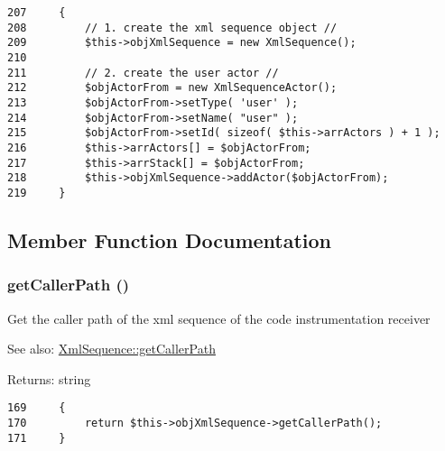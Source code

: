 \begin{Code}\begin{verbatim}207     {
208         // 1. create the xml sequence object //
209         $this->objXmlSequence = new XmlSequence();
210 
211         // 2. create the user actor //  
212         $objActorFrom = new XmlSequenceActor();
213         $objActorFrom->setType( 'user' );
214         $objActorFrom->setName( "user" );
215         $objActorFrom->setId( sizeof( $this->arrActors ) + 1 );
216         $this->arrActors[] = $objActorFrom;
217         $this->arrStack[] = $objActorFrom;
218         $this->objXmlSequence->addActor($objActorFrom);
219     }
\end{verbatim}
\end{Code}




\subsection{Member Function Documentation}
\hypertarget{class_code_instrumentation_receiver_a8c839c9d33ebad153541a31ffc7ef3e}{
\subsubsection[{getCallerPath}]{\setlength{\rightskip}{0pt plus 5cm}getCallerPath ()}}
\label{class_code_instrumentation_receiver_a8c839c9d33ebad153541a31ffc7ef3e}


Get the caller path of the xml sequence of the code instrumentation receiver

\begin{Desc}
\item[See also:]\hyperlink{class_xml_sequence_a8c839c9d33ebad153541a31ffc7ef3e}{XmlSequence::getCallerPath} \end{Desc}
\begin{Desc}
\item[Returns:]string \end{Desc}


\begin{Code}\begin{verbatim}169     {
170         return $this->objXmlSequence->getCallerPath();  
171     }
\end{verbatim}
\end{Code}


